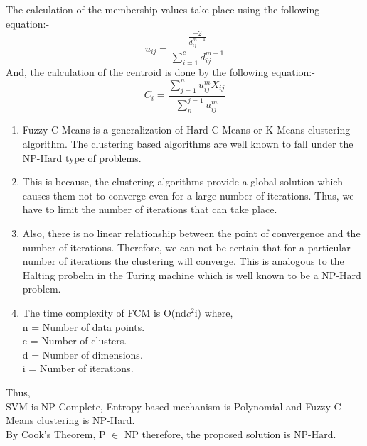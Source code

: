\documentclass[12pt,a4paper,final]{report}
\begin{document}
{{{{{\begin{itemize}
The calculation of the membership values take place using the following equation:- 
\begin{equation}
u_{ij} = \frac{\frac{-2}{d_{ij}^{m-1}}}{\sum_{i=1}^{c}{{d_{ij}^{m-1}}}}
\end{equation}
And, the calculation of the centroid is done by the following equation:- 
\begin{equation}
C_{i} = \frac{\sum_{j=1}^{n}u_{ij}^{m}X_{ij}}{\sum_{n}^{j=1}u_{ij}^{m}}
\end{equation}

\newpage
\begin{enumerate}
\item
Fuzzy C-Means is a generalization of Hard C-Means or K-Means clustering algorithm. The clustering based algorithms are well known to fall under the NP-Hard type of problems.
\item
This is because, the clustering algorithms provide a global solution which causes them not to converge even for a large number of iterations. Thus, we have to limit the number of iterations that can take place.\\
\item
Also, there is no linear relationship between the point of convergence and the number of iterations. Therefore, we can not be certain that for a particular number of iterations the clustering will converge. This is analogous to the Halting probelm in the Turing machine which is well known to be a NP-Hard problem.
\item
The time complexity of FCM is O(nd$c^{2}$i) where, \\
n = Number of data points. \\
c = Number of clusters. \\
d = Number of dimensions. \\
i = Number of iterations. \\
\end{enumerate}
Thus, \\
SVM is NP-Complete, Entropy based mechanism is Polynomial and Fuzzy C-Means clustering is NP-Hard.\\
By Cook's Theorem, P $\in$ NP therefore, the proposed solution is NP-Hard. 
\end{itemize}
\newpage

}}}}}
\end{document}
